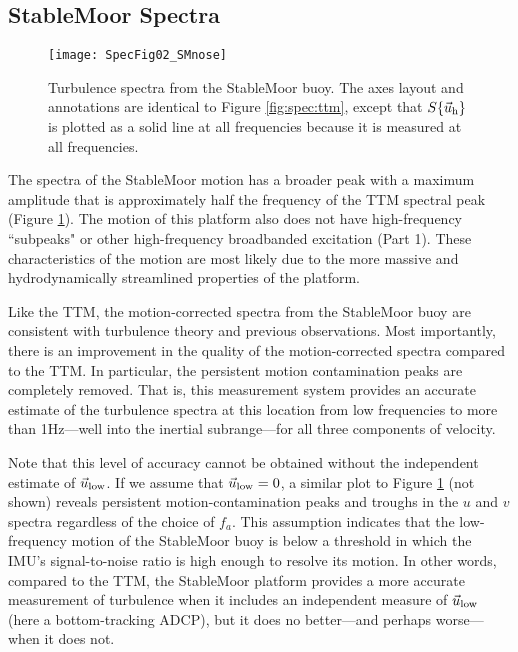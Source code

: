 \subsection{StableMoor Spectra}

\begin{figure*}[th]
  \centering
  \texttt{[image: SpecFig02\_SMnose]}
  \caption{Turbulence spectra from the StableMoor buoy. The axes layout and annotations are identical to Figure \ref{fig:spec:ttm}, except that $S\{\vec{u}_\mathrm{h}\}$ is plotted as a solid line at all frequencies because it is measured at all frequencies. }
  \label{fig:spec:sm}
\end{figure*}

The spectra of the StableMoor motion has a broader peak with a maximum amplitude that is approximately half the frequency of the TTM spectral peak (Figure \ref{fig:spec:sm}). The motion of this platform also does not have high-frequency ``subpeaks" or other high-frequency broadbanded excitation (Part 1).  These characteristics of the motion are most likely due to the more massive and hydrodynamically streamlined properties of the platform. 

Like the TTM, the motion-corrected spectra from the StableMoor buoy are consistent with turbulence theory and previous observations. Most importantly, there is an improvement in the quality of the motion-corrected spectra compared to the TTM. In particular, the persistent motion contamination peaks are completely removed. That is, this measurement system provides an accurate estimate of the turbulence spectra at this location from low frequencies to more than 1Hz---well into the inertial subrange---for all three components of velocity.

Note that this level of accuracy cannot be obtained without the independent estimate of $\vec{u}_\mathrm{low}$. If we assume that $\vec{u}_\mathrm{low}=0$, a similar plot to Figure \ref{fig:spec:sm} (not shown) reveals persistent motion-contamination peaks and troughs in the $u$ and $v$ spectra regardless of the choice of $f_a$. This assumption indicates that the low-frequency motion of the StableMoor buoy is below a threshold in which the IMU's signal-to-noise ratio is high enough to resolve its motion. In other words, compared to the TTM, the StableMoor platform provides a more accurate measurement of turbulence when it includes an independent measure of $\vec{u}_\mathrm{low}$ (here a bottom-tracking ADCP), but it does no better---and perhaps worse---when it does not.
%
%


